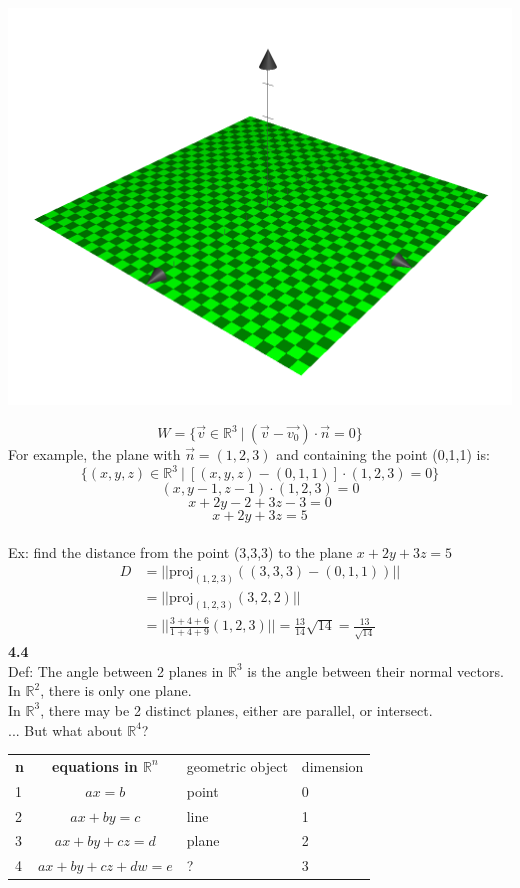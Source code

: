 \documentclass[]{article}
\begin{document}
		\begin{center}
			\includegraphics[scale=0.7]{./graphics/plane-1.png}
		\end{center}
		$$
		W=\{ \vec{v}\in\mathbb{R}^3~|~(\vec{v}-\vec{v_0})\cdot\vec{n}=0 \}
		$$
		For example, the plane with $\vec{n}=(1,2,3)$ and containing the point (0,1,1) is:
		$$\{ (x,y,z)\in\mathbb{R}^3~|~[(x,y,z)-(0,1,1)]\cdot(1,2,3)=0 \}$$
		$$(x,y-1,z-1)\cdot(1,2,3)=0$$
		$$x+2y-2+3z-3=0$$
		$$x+2y+3z=5$$\\
		Ex: find the distance from the point (3,3,3) to the plane $x+2y+3z=5$\\
		\begin{align*}
			D&=||\text{proj}_{(1,2,3)}((3,3,3)-(0,1,1))||\\
			&=||\text{proj}_{(1,2,3)}(3,2,2)||\\
			&=|| \frac{3+4+6}{1+4+9}(1,2,3) ||=\frac{13}{14}\sqrt{14}=\frac{13}{\sqrt{14}}
		\end{align*}
		{\bf 4.4}\\
		Def: The angle between 2 planes in $\mathbb{R}^3$ is the angle between their normal vectors.\\
		In $\mathbb{R}^2$, there is only one plane.\\
		In $\mathbb{R}^3$, there may be 2 distinct planes, either are parallel, or intersect.\\
		... But what about $\mathbb{R}^4$?
		\pagebreak\\
		\begin{center}
			\begin{tabular}{ l | c | l | l }
				\hline                        
					{\bf n} & {\bf equations in $\mathbb{R}^n$} & geometric object & dimension \\
					1 & $ax=b$ & point & 0\\
					2 & $ax+by=c$ & line & 1\\
					3 & $ax+by+cz=d$ & plane & 2\\
					4 & $ax+by+cz+dw=e$ & ? & 3\\
				\hline  
			\end{tabular}
		\end{center}
\end{document}
